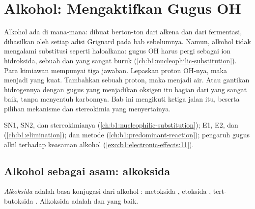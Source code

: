 \chapter{Alkohol: Mengaktifkan Gugus OH}\label{ch:b1:alcohol-activation}

Alkohol ada di mana-mana: dibuat berton-ton dari alkena dan dari
fermentasi, dihasilkan oleh setiap adisi Grignard pada bab sebelumnya.
Namun, alkohol tidak mengalami substitusi seperti haloalkana: gugus OH
harus pergi sebagai ion hidroksida, sebuah  dan  yang
sangat buruk (\cref{ch:b1:nucleophilic-substitution}). Para kimiawan
mempunyai tiga jawaban. Lepaskan proton OH-nya, maka  menjadi
 yang kuat. Tambahkan sebuah proton, maka  menjadi
air. Atau gantikan hidrogennya dengan gugus yang menjadikan oksigen itu
bagian dari  yang sangat baik, tanpa menyentuh karbonnya. Bab
ini mengikuti ketiga jalan itu, beserta pilihan mekanisme dan
stereokimia yang menyertainya.

\begin{recall}
SN1, SN2, dan stereokimianya (\cref{ch:b1:nucleophilic-substitution});
E1, E2, dan  (\cref{ch:b1:elimination}); 
dan metode  (\cref{ch:b1:predominant-reaction});
pengaruh gugus alkil terhadap keasaman alkohol
(\cref{exo:b1:electronic-effects:11}).
\end{recall}

\section{Alkohol sebagai asam: alkoksida}

\begin{definition}[Alkoksida]\label{def:b1:alcohol-activation:alkoxide}
\emph{Alkoksida} adalah basa konjugasi  dari
alkohol : metoksida , etoksida ,
tert-butoksida . Alkoksida adalah  dan 
yang baik.
\end{definition}

